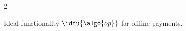 \begin{figure}
\begin{minipage}{1.1\textwidth}
\begin{framed}
\begin{multicols}{2}
\begin{enumerate}
\begin{enumerate}
          \end{enumerate}

      \end{enumerate}

    \end{multicols}

  \end{framed}

\end{minipage}

\caption{Ideal functionality $\idfu{\algo{op}}$ for offline payments.}
\label{fig:ideal-func} \end{figure}
